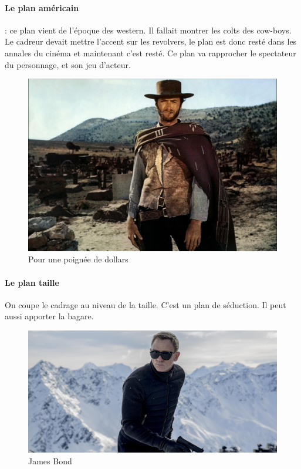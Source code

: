 \documentclass{article}
\begin{document}
	\paragraph{Le plan américain}: ce plan vient de l'époque des western. Il fallait montrer les colts des cow-boys. Le cadreur devait mettre l'accent sur les revolvers, le plan est donc resté dans les annales du cinéma et maintenant c'est resté. Ce plan va rapprocher le spectateur du personnage, et son jeu d'acteur.

\begin{figure}[h]
\centering
\includegraphics[scale=0.13]{img/plan5.jpg}
\caption{Pour une poignée de dollars}
\label{fig:regle_tiers}
\end{figure}

	\paragraph{Le plan taille} On coupe le cadrage au niveau de la taille. C'est un plan de séduction. Il peut aussi apporter la bagare. 

\begin{figure}[h]
\centering
\includegraphics[scale=0.6]{img/plan6.jpg}
\caption{James Bond}
\label{fig:regle_tiers}
\end{figure}
\end{document}
